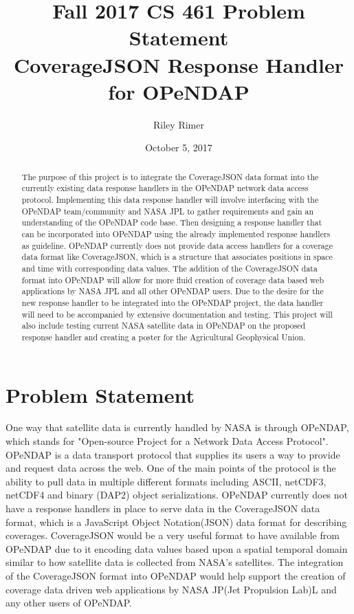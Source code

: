 \documentclass[letterpaper,10pt,draftclsnofoot,onecolumn]{IEEEtran}
\title{
Fall 2017 CS 461 Problem Statement\\
\large CoverageJSON Response Handler for OPeNDAP
}
\author{Riley Rimer}
\date{October 5, 2017}
\begin{document}
\begin{titlepage}

\maketitle
\centering

\begin{abstract}
The purpose of this project is to integrate the CoverageJSON data format into the currently existing data response handlers in the OPeNDAP network data access protocol. Implementing this data response handler will involve interfacing with the OPeNDAP team/community and NASA JPL to gather requirements and gain an understanding of the OPeNDAP code base. Then designing a response handler that can be incorporated into OPeNDAP using the already implemented response handlers as guideline. OPeNDAP currently does not provide data access handlers for a coverage data format like CoverageJSON, which is a structure that associates positions in space and time with corresponding data values. The addition of the CoverageJSON data format into OPeNDAP will allow for more fluid creation of coverage data based web applications by NASA JPL and all other OPeNDAP users. Due to the desire for the new response handler to be integrated into the OPeNDAP project, the data handler will need to be accompanied by extensive documentation and testing. This project will also include testing current NASA satellite data in OPeNDAP on the proposed response handler and creating a poster for the Agricultural Geophysical Union.
\end{abstract}

\end{titlepage}

\section{Problem Statement}
One way that satellite data is currently handled by NASA is through OPeNDAP, which stands for "Open-source Project for a Network Data Access Protocol". OPeNDAP is a data transport protocol that supplies its users a way to provide and request data across the web. One of the main points of the protocol is the ability  to pull data in multiple different formats including ASCII, netCDF3, netCDF4 and binary (DAP2) object serializations. OPeNDAP currently does not have a response handlers in place to serve data in the CoverageJSON data format, which is a JavaScript Object Notation(JSON) data format for describing coverages. CoverageJSON would be a very useful format to have available from OPeNDAP due to it encoding data values based upon a spatial temporal domain similar to how satellite data is collected from NASA's satellites. The integration of the CoverageJSON format into OPeNDAP would help support the creation of coverage data driven web applications by NASA JP(Jet Propulsion Lab)L and any other users of OPeNDAP.
\end{document}
